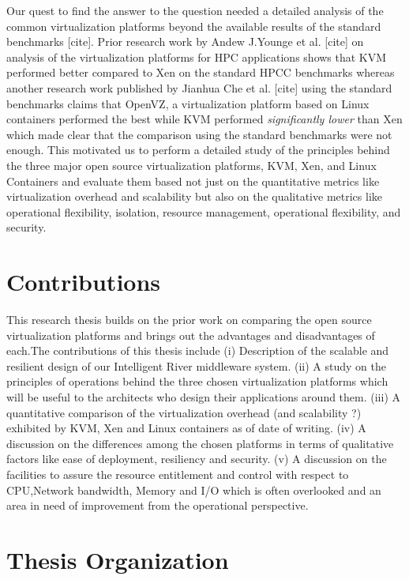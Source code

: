 Our quest to find the answer to the question needed a detailed analysis of the common virtualization platforms beyond the available results of the standard benchmarks [cite]. Prior research work by Andew J.Younge et al. [cite] on analysis of the virtualization platforms for HPC applications shows that KVM performed better compared to Xen on the standard HPCC benchmarks whereas another research work published by Jianhua Che et al. [cite] using the standard benchmarks claims that OpenVZ, a virtualization platform based on Linux containers performed the best while KVM performed \textit{significantly lower} than Xen which made clear that the comparison using the standard benchmarks were not enough. This motivated us to perform a detailed study of the principles behind the three major open source virtualization platforms, KVM, Xen, and Linux Containers and evaluate them based not just on the quantitative metrics like virtualization overhead and scalability but also on the qualitative metrics like operational flexibility, isolation, resource management, operational flexibility, and security. 

\section{Contributions}

This research thesis builds on the prior work on comparing the open source virtualization platforms and brings out the advantages and disadvantages of each.The contributions of this thesis include (i) Description of the scalable and resilient design of our Intelligent River\textsuperscript{\textregistered} middleware system. (ii) A study on the principles of operations behind the three chosen virtualization platforms which will be useful to the architects who design their applications around them. (iii) A quantitative comparison of the virtualization overhead (and scalability ?) exhibited by KVM, Xen and Linux containers as of date of writing. (iv) A discussion on the differences among the chosen platforms in terms of qualitative factors like ease of deployment, resiliency and security. (v) A discussion on the facilities to assure the resource entitlement and control with respect to CPU,Network bandwidth, Memory and I/O  which is often overlooked and an area in need of improvement from the operational perspective.
 
\section{Thesis Organization}

